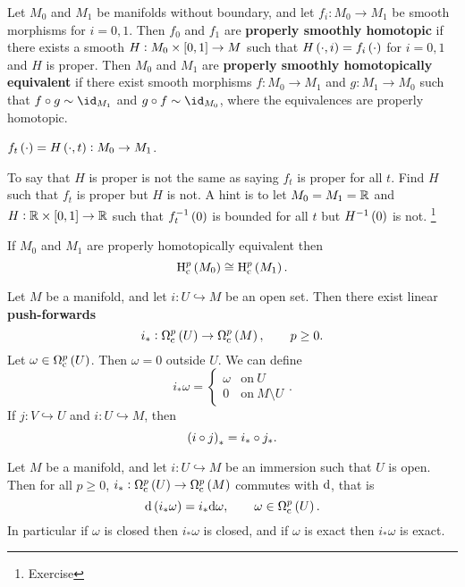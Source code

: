 
\begin{definition}
Let $ M_0 $ and $ M_1 $ be manifolds without boundary, and let $ f_i : M_0 \to M_1 $ be smooth morphisms for $ i = 0, 1 $. Then $ f_0 $ and $ f_1 $ are \textbf{properly smoothly homotopic} if there exists a smooth $ H : M_0 \times \sbr{0, 1} \to M $ such that $ H\br{\cdot, i} = f_i\br{\cdot} $ for $ i = 0, 1 $ and $ H $ is proper. Then $ M_0 $ and $ M_1 $ are \textbf{properly smoothly homotopically equivalent} if there exist smooth morphisms $ f : M_0 \to M_1 $ and $ g : M_1 \to M_0 $ such that $ f \circ g \sim \id_{M_1} $ and $ g \circ f \sim \id_{M_0} $, where the equivalences are properly homotopic.
\end{definition}

\begin{notation*}
$ f_t\br{\cdot} = H\br{\cdot, t} : M_0 \to M_1 $.
\end{notation*}

\begin{remark}
To say that $ H $ is proper is not the same as saying $ f_t $ is proper for all $ t $. Find $ H $ such that $ f_t $ is proper but $ H $ is not. A hint is to let $ M_0 = M_1 = \mathbb{R} $ and $ H : \RR \times \sbr{0, 1} \to \RR $ such that $ f_t^{-1}\br{0} $ is bounded for all $ t $ but $ H^{-1}\br{0} $ is not. \footnote{Exercise}
\end{remark}

\begin{proposition}
If $ M_0 $ and $ M_1 $ are properly homotopically equivalent then
$$ \H_\c^p\br{M_0} \cong \H_\c^p\br{M_1}. $$
\end{proposition}

Let $ M $ be a manifold, and let $ i : U \hookrightarrow M $ be an open set. Then there exist linear \textbf{push-forwards}
$$ i_* : \Omega_\c^p\br{U} \to \Omega_\c^p\br{M}, \qquad p \ge 0. $$
Let $ \omega \in \Omega_\c^p\br{U} $. Then $ \omega = 0 $ outside $ U $. We can define
$$ i_*\omega =
\begin{cases}
\omega & \text{on} \ U \\
0 & \text{on} \ M \setminus U
\end{cases}.
$$
If $ j : V \hookrightarrow U $ and $ i : U \hookrightarrow M $, then
$$ \br{i \circ j}_* = i_* \circ j_*. $$

\pagebreak

\begin{lemma}
Let $ M $ be a manifold, and let $ i : U \hookrightarrow M $ be an immersion such that $ U $ is open. Then for all $ p \ge 0 $, $ i_* : \Omega_\c^p\br{U} \to \Omega_\c^p\br{M} $ commutes with $ \mathrm{d} $, that is
$$ \d\br{i_*\omega} = i_*\d\omega, \qquad \omega \in \Omega_\c^p\br{U}. $$
In particular if $ \omega $ is closed then $ i_*\omega $ is closed, and if $ \omega $ is exact then $ i_*\omega $ is exact.
\end{lemma}

